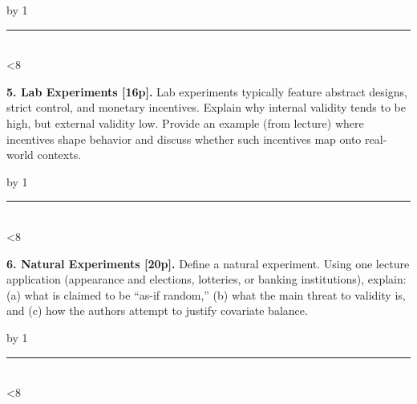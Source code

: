 \documentclass[12pt]{article}
\newcommand{\answerlines}[1]{%
  \mycount=0%
  \vspace{0.2cm}%
  \loop
    \advance\mycount by 1%
    \noindent\rule{\linewidth}{0.4pt}\\[0.4cm]
  \ifnum\mycount<#1
  \repeat
  \vspace{0.2cm}
}
\begin{document}
\answerlines{8}

\textbf{5. Lab Experiments [16p].} Lab experiments typically feature abstract designs, strict control, and monetary incentives. Explain why internal validity tends to be high, but external validity low. Provide an example (from lecture) where incentives shape behavior and discuss whether such incentives map onto real-world contexts.  
 
\answerlines{8}

\textbf{6. Natural Experiments [20p].} Define a natural experiment. Using one lecture application (appearance and elections, lotteries, or banking institutions), explain:  
(a) what is claimed to be ``as-if random,''  
(b) what the main threat to validity is, and  
(c) how the authors attempt to justify covariate balance.  
 
\answerlines{8}



\end{document}
